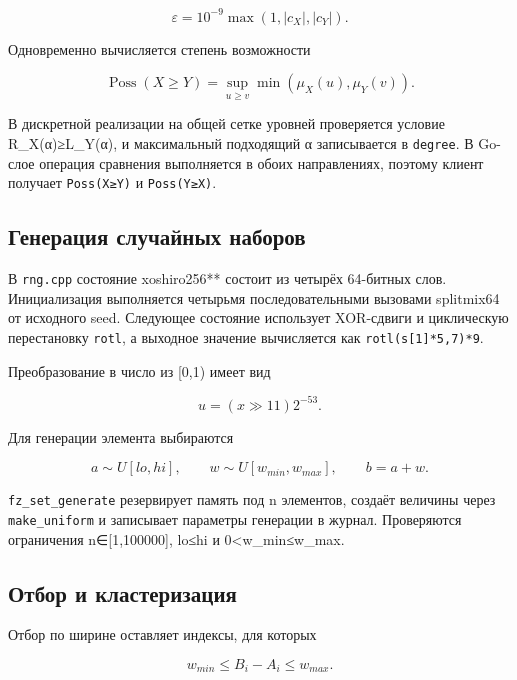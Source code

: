\begin{equation}
\varepsilon=10^{-9}\max(1,|c_X|,|c_Y|).
\end{equation}

Одновременно вычисляется степень возможности

\begin{equation}
\operatorname{Poss}(X\geq Y)= \sup_{u\geq v}\min(\mu_X(u),\mu_Y(v)).
\end{equation}

В дискретной реализации на общей сетке уровней проверяется условие R\_X(α)≥L\_Y(α), и максимальный подходящий α записывается в \texttt{degree}. В Go-слое операция сравнения выполняется в обоих направлениях, поэтому клиент получает \texttt{Poss(X≥Y)} и \texttt{Poss(Y≥X)}.

\subsection{Генерация случайных наборов}

В \texttt{rng.cpp} состояние xoshiro256** состоит из четырёх 64-битных слов. Инициализация выполняется четырьмя последовательными вызовами splitmix64 от исходного seed. Следующее состояние использует XOR-сдвиги и циклическую перестановку \texttt{rotl}, а выходное значение вычисляется как \texttt{rotl(s[1]*5,7)*9}.

Преобразование в число из [0,1) имеет вид

\begin{equation}
u=(x\mathbin{\gg}11)2^{-53}.
\end{equation}

Для генерации элемента выбираются

\begin{equation}
a\sim U[lo,hi],\qquad w\sim U[w_{min},w_{max}],\qquad b=a+w.
\end{equation}

\texttt{fz\_set\_generate} резервирует память под n элементов, создаёт величины через \texttt{make\_uniform} и записывает параметры генерации в журнал. Проверяются ограничения n∈[1,100000], lo≤hi и 0<w\_min≤w\_max.

\subsection{Отбор и кластеризация}

Отбор по ширине оставляет индексы, для которых

\begin{equation}
w_{min}\leq B_i-A_i\leq w_{max}.
\end{equation}

